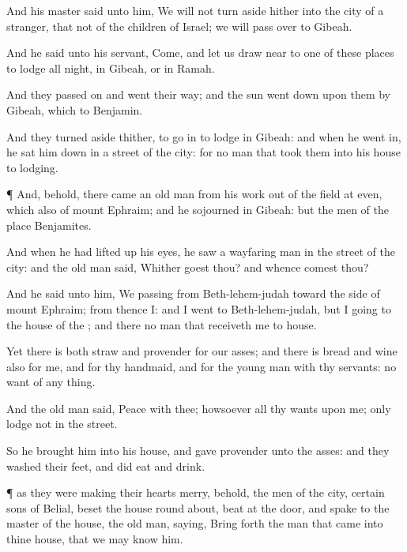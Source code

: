 {And his
master
said unto him, We will not turn
aside hither into the
city of a
stranger, that
{} not of the
children of
Israel; we will pass
over to
Gibeah.

And he
said unto his
servant,
Come, and let us draw
near to
one of these
places to lodge all
night, in
Gibeah, or in
Ramah.

And they passed
on and went their
way; and the
sun went
down upon them
{}
by
Gibeah, which
{} to
Benjamin.

And they turned
aside thither, to go
in
{} to
lodge in
Gibeah: and when he went
in, he sat him
down in a
street of the
city: for
{} no
man that
took them into his
house to
lodging.


\par }{\PP {}¶ And, behold, there
came an
old
man from his
work out of the
field at
even, which
{}
also of
mount
Ephraim; and he
sojourned in
Gibeah: but the
men of the
place
{}
Benjamites.

And when he had lifted
up his
eyes, he
saw a
wayfaring
man in the
street of the
city: and the
old
man
said, Whither
goest thou? and
whence
comest thou?

And he
said unto him, We
{}
passing from
Beth-lehem-judah toward the
side of
mount
Ephraim; from thence
{} I: and I
went to
Beth-lehem-judah, but I
{}
going to the
house of the
{}; and there
{} no
man that
receiveth me to
house.

Yet there
is both
straw and
provender for our
asses; and there is
bread and
wine also for me, and for thy
handmaid, and for the young
man
{} with thy
servants:
{} no
want of any
thing.

And the
old
man
said,
Peace
{} with thee;
howsoever
{} all thy
wants
{} upon me; only
lodge not in the
street.

So he
brought him into his
house, and gave
provender unto the
asses: and they
washed their
feet, and did
eat and
drink.


\par }{\PP {}¶
{} as they were making their
hearts
merry, behold, the
men of the
city,
certain
sons of
Belial,
beset the
house round
about,
{}
beat at the
door, and
spake to the
master of the
house, the
old
man,
saying, Bring
forth the
man that
came into thine
house, that we may
know him.

}
